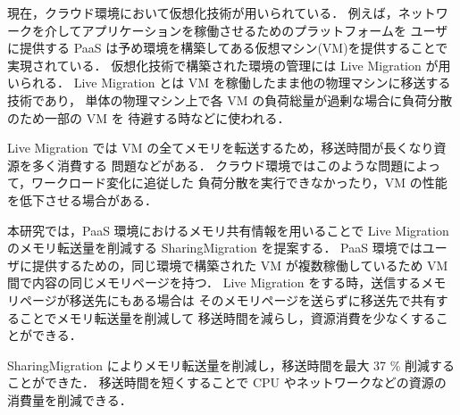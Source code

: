 \setlength{\parindent}{12pt}
現在，クラウド環境において仮想化技術が用いられている．
例えば，ネットワークを介してアプリケーションを稼働させるためのプラットフォームを
ユーザに提供する PaaS は予め環境を構築してある仮想マシン(VM)を提供することで実現されている．
仮想化技術で構築された環境の管理には Live Migration が用いられる．
Live Migration とは VM を稼働したまま他の物理マシンに移送する技術であり，
単体の物理マシン上で各 VM の負荷総量が過剰な場合に負荷分散のため一部の VM を
待避する時などに使われる．

Live Migration では VM の全てメモリを転送するため，移送時間が長くなり資源を多く消費する
問題などがある．
クラウド環境ではこのような問題によって，ワークロード変化に追従した
負荷分散を実行できなかったり，VM の性能を低下させる場合がある．

本研究では，PaaS 環境におけるメモリ共有情報を用いることで Live Migration
のメモリ転送量を削減する SharingMigration を提案する．
PaaS 環境ではユーザに提供するための，同じ環境で構築された VM が複数稼働しているため
VM 間で内容の同じメモリページを持つ．
Live Migration をする時，送信するメモリページが移送先にもある場合は
そのメモリページを送らずに移送先で共有することでメモリ転送量を削減して
移送時間を減らし，資源消費を少なくすることができる．

SharingMigration によりメモリ転送量を削減し，移送時間を最大 37 \% 削減することができた．
移送時間を短くすることで CPU やネットワークなどの資源の消費量を削減できる．
                                                                         
